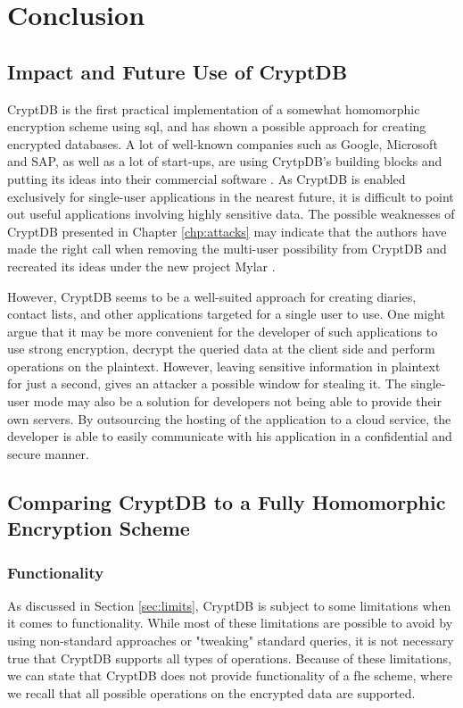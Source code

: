 \chapter{Conclusion}
\label{chp:conclusion}

\section{Impact and Future Use of CryptDB}

CryptDB is the first practical implementation of a somewhat homomorphic encryption scheme using \gls{sql}, and has shown a possible approach for creating encrypted databases. A lot of well-known companies such as Google, Microsoft and SAP, as well as a lot of start-ups, are using CrytpDB's building blocks and putting its ideas into their commercial software \cite{cryptdb_homepage}. As CryptDB is enabled exclusively for single-user applications in the nearest future, it is difficult to point out useful applications involving highly sensitive data. The possible weaknesses of CryptDB presented in Chapter \ref{chp:attacks} may indicate that the authors have made the right call when removing the multi-user possibility from CryptDB and recreated its ideas under the new project Mylar \cite{mylar_homepage}.  

However, CryptDB seems to be a well-suited approach for creating diaries, contact lists, and other applications targeted for a single user to use. One might argue that it may be more convenient for the developer of such applications to use strong encryption, decrypt the queried data at the client side and perform operations on the plaintext. However, leaving sensitive information in plaintext for just a second, gives an attacker a possible window for stealing it. The single-user mode may also be a solution for developers not being able to provide their own servers. By outsourcing the hosting of the application to a cloud service, the developer is able to easily communicate with his application in a confidential and secure manner.


\section{Comparing CryptDB to a Fully Homomorphic Encryption Scheme}

\subsection{Functionality}
As discussed in Section \ref{sec:limits}, CryptDB is subject to some limitations when it comes to functionality. While most of these limitations are possible to avoid by using non-standard approaches or "tweaking" standard queries, it is not necessary true that CryptDB supports all types of operations. Because of these limitations, we can state that CryptDB does not provide functionality of a \gls{fhe} scheme, where we recall that all possible operations on the encrypted data are supported.

